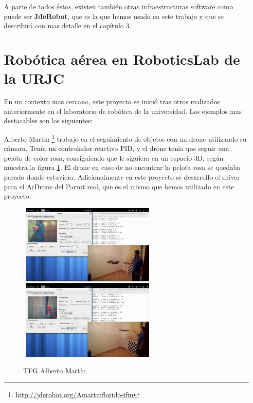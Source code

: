 \hspace{1 cm} A parte de todos \'estos, existen tambi\'en otras infraestructuras software como puede ser \textbf{JdeRobot}, que es la que hemos usado en este trabajo y que se describir\'a con mas detalle en el cap\'itulo 3. 


	

\section{Rob\'otica a\'erea en RoboticsLab de la URJC}
\hspace{1 cm} En un contexto mas cercano, este proyecto se inici\'o tras otros realizados anteriormente en el laboratorio de rob\'otica de la universidad. Los ejemplos mas destacables son los siguientes:



\hspace{1 cm} Alberto Mart\'in \footnote{\url{http://jderobot.org/Amartinflorido-tfm}} \cite{MediaWikiAlbertoMartinFlorido} trabaj\'o en el seguimiento de objetos con un drone utilizando su c\'amara. Ten\'ia un controlador reactivo PID, y el drone ten\'ia que seguir una pelota de color rosa, consiguiendo que le siguiera en un espacio 3D, seg\'un muestra la figura \ref{f:AlbertoMartin}. El drone en caso de no encontrar la pelota rosa se quedaba parado donde estuviera. Adicionalmente en este proyecto se desarrollo el driver para el ArDrone del Parrot real, que es el mismo que hemos utilizado en este proyecto.
\begin{figure}[H]
 \centering
    \includegraphics[width=7cm,height=4cm]{imgs/AlbertoMartin1_1.png}
    \includegraphics[width=7cm,height=4cm]{imgs/AlbertoMartin2_1.png}
 \caption{TFG Alberto Mart\'in.}
 \label{f:AlbertoMartin}
\end{figure} 


